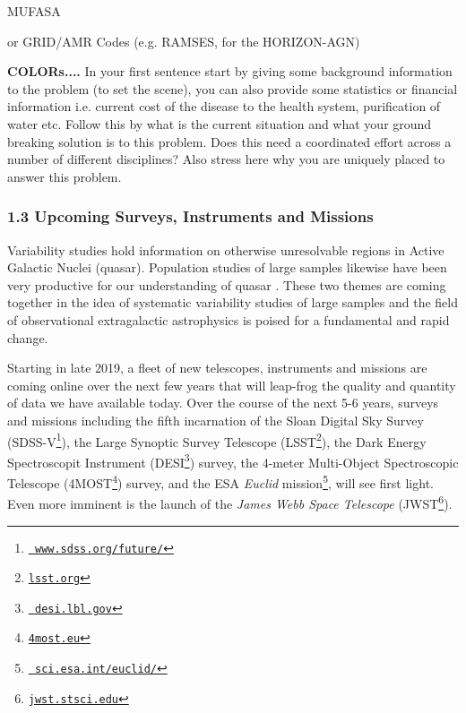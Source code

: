 
MUFASA

or 
GRID/AMR Codes
(e.g. RAMSES, 
for the HORIZON-AGN)



 

\smallskip
\smallskip
\noindent
{\bf COLORs....} In your first sentence start by giving some background information to the problem (to set the scene), you can also provide some statistics or financial information i.e. current cost of the disease to the health system, purification of water etc. Follow this by what is the current situation and what your ground breaking solution is to this problem. Does this need a coordinated effort across a number of different disciplines? Also stress here why you are uniquely placed to answer this problem.



\subsubsection*{1.3 Upcoming Surveys, Instruments and Missions}
\smallskip
\smallskip
\noindent
Variability studies hold information on otherwise unresolvable regions in Active Galactic Nuclei (quasar). Population studies of large samples likewise have been very productive for our understanding of quasar
\citep{Lawrence2016_ASPC}. 
These two themes are coming together in the idea of systematic variability studies of large samples and the field of observational extragalactic astrophysics is poised for a fundamental and rapid change. 

\smallskip
\smallskip
\noindent
Starting in late 2019, a fleet of new telescopes, instruments and missions are coming 
online over the next few years that will leap-frog the quality and
quantity of data we have available today. Over the course of the next
5-6 years, surveys and missions including the fifth incarnation of the
Sloan Digital Sky Survey
(SDSS-V\footnote{\href{www.sdss.org/future/}{{\tt
www.sdss.org/future/}}}), the Large Synoptic Survey Telescope
(LSST\footnote{\href{lsst.org}{{\tt lsst.org}}}), the Dark Energy
Spectroscopit Instrument (DESI\footnote{\href{desi.lbl.gov}{{\tt
desi.lbl.gov}}}) survey, the 4-meter Multi-Object Spectroscopic
Telescope (4MOST\footnote{\href{4most.eu}{{\tt 4most.eu}}}) survey,
and the ESA {\it Euclid}
mission\footnote{\href{sci.esa.int/euclid/}{{\tt
sci.esa.int/euclid/}}}, will see first light. Even more imminent is
the launch of the {\it James Webb Space Telescope}
(JWST\footnote{\href{jwst.stsci.edu}{{\tt jwst.stsci.edu}}}).



